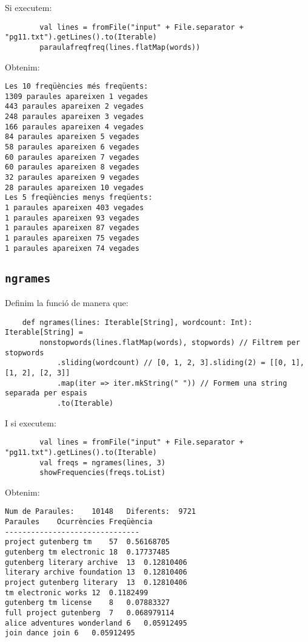 \documentclass{article}
\begin{document}
Si executem:

\begin{lstlisting}
        val lines = fromFile("input" + File.separator + "pg11.txt").getLines().to(Iterable)
        paraulafreqfreq(lines.flatMap(words))
\end{lstlisting}

Obtenim:

\begin{verbatim}
Les 10 freqüències més freqüents:
1309 paraules apareixen 1 vegades
443 paraules apareixen 2 vegades
248 paraules apareixen 3 vegades
166 paraules apareixen 4 vegades
84 paraules apareixen 5 vegades
58 paraules apareixen 6 vegades
60 paraules apareixen 7 vegades
60 paraules apareixen 8 vegades
32 paraules apareixen 9 vegades
28 paraules apareixen 10 vegades
Les 5 freqüències menys freqüents:
1 paraules apareixen 403 vegades
1 paraules apareixen 93 vegades
1 paraules apareixen 87 vegades
1 paraules apareixen 75 vegades
1 paraules apareixen 74 vegades
\end{verbatim}

\subsection{\texttt{ngrames}}

Definim la funció de manera que:

\begin{lstlisting}
    def ngrames(lines: Iterable[String], wordcount: Int): Iterable[String] =
        nonstopwords(lines.flatMap(words), stopwords) // Filtrem per stopwords
            .sliding(wordcount) // [0, 1, 2, 3].sliding(2) = [[0, 1], [1, 2], [2, 3]]
            .map(iter => iter.mkString(" ")) // Formem una string separada per espais
            .to(Iterable)
\end{lstlisting}

I si executem:

\begin{lstlisting}
        val lines = fromFile("input" + File.separator + "pg11.txt").getLines().to(Iterable)
        val freqs = ngrames(lines, 3)
        showFrequencies(freqs.toList)
\end{lstlisting}

Obtenim:

\begin{verbatim}
Num de Paraules:	10148	Diferents:	9721
Paraules	Ocurrències	Freqüència
-------------------------------
project gutenberg tm	57	0.56168705
gutenberg tm electronic	18	0.17737485
gutenberg literary archive	13	0.12810406
literary archive foundation	13	0.12810406
project gutenberg literary	13	0.12810406
tm electronic works	12	0.1182499
gutenberg tm license	8	0.07883327
full project gutenberg	7	0.068979114
alice adventures wonderland	6	0.05912495
join dance join	6	0.05912495
\end{verbatim}
\end{document}
